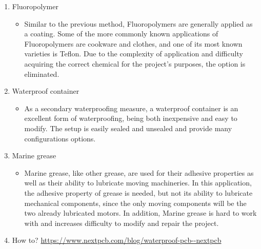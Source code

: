 \documentclass{article}[10pt]
\begin{document}
\begin{enumerate}
\begin{itemize}
          \end{itemize}
    \item Fluoropolymer
          \begin{itemize}
              \item Similar to the previous method, Fluoropolymers are generally applied as a coating. Some of the more commonly known applications of Fluoropolymers are cookware and clothes, and one of its most known varieties is Teflon. Due to the complexity of application and difficulty acquiring the correct chemical for the project’s purposes, the option is eliminated.
          \end{itemize}
    \item Waterproof container
          \begin{itemize}
              \item As a secondary waterproofing measure, a waterproof container is an excellent form of waterproofing, being both inexpensive and easy to modify. The setup is easily sealed and unsealed and provide many configurations options.
          \end{itemize}
    \item Marine grease 
    \begin{itemize}
        \item Marine grease, like other grease, are used for their adhesive properties as well as their ability to lubricate moving machineries. In this application, the adhesive property of grease is needed, but not its ability to lubricate mechanical components, since the only moving components will be the two already lubricated motors. In addition, Marine grease is hard to work with and increases difficulty to modify and repair the project.
    \end{itemize}
    \item How to? \url{https://www.nextpcb.com/blog/waterproof-pcb--nextpcb}
\end{enumerate}
\end{document}

